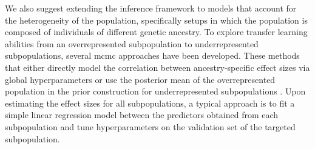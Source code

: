 We also suggest extending the inference framework to models that account for the heterogeneity of the population, specifically setups in which the population is composed of individuals of different genetic ancestry. To explore transfer learning abilities from an overrepresented subpopulation to underrepresented subpopulations, several \gls{mcmc} approaches have been developed. These methods that either directly model the correlation between ancestry-specific effect sizes via global hyperparameters \cite{prscsx,mussel,JointPRS} or use the posterior mean of the overrepresented population in the prior construction for underrepresented subpopulations \cite{BridgePRS}. Upon estimating the effect sizes for all subpopulations, a typical approach is to fit a simple linear regression model between the predictors obtained from each subpopulation and tune hyperparameters on the validation set of the targeted subpopulation. 

